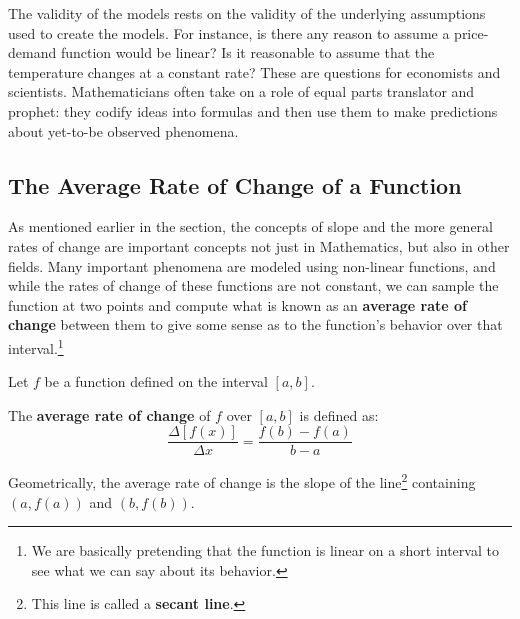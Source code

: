 \documentclass{ximera}
\begin{document}
The validity of the models rests on the validity of the underlying assumptions used to create the models.  For instance, is there any reason to assume a price-demand function would be linear?  Is it reasonable to assume that the temperature changes at a constant rate? These are questions for economists and scientists.  Mathematicians often take on a role of equal parts translator and prophet:  they codify ideas into formulas and then use them to make predictions about yet-to-be observed phenomena.  


\subsection{The Average Rate of Change of a Function}
\label{AverageRateofChange}

As mentioned earlier in the section, the concepts of slope and the more general rates of change are important concepts not just in Mathematics, but also in other fields.   Many important phenomena are modeled using non-linear functions, and while the rates of change of these functions are not constant, we can sample the function at two points and compute what is known as an \textbf{average rate of change} between them to give some sense as to the function's behavior over that interval.\footnote{We are basically pretending that the function is linear on a short interval to see what we can say about its behavior.}



\colorbox{ResultColor}{\bbm

\begin{defn} \label{arc}  Let $f$ be a function defined on the interval $[a,b]$. 

\smallskip

 The \textbf{average rate of change}  of $f$ over $[a,b]$ is defined as: \[ \dfrac{\Delta [f(x)]}{\Delta x} = \dfrac{f(b) - f(a)}{b-a} \]

Geometrically, the average rate of change is the slope of the line\footnote{This line is called a \textbf{secant line}.}  containing $(a, f(a))$ and $(b, f(b))$.

\end{defn}

\ebm}
\end{document}
